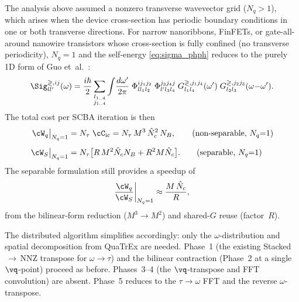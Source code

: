 The analysis above assumed a nonzero transverse wavevector
grid ($N_q > 1$), which arises when the device cross-section
has periodic boundary conditions in one or both transverse
directions.  For narrow nanoribbons, FinFETs, or gate-all-around
nanowire transistors whose cross-section is fully confined
(no transverse periodicity), $N_q = 1$ and the self-energy
\cref{eq:sigma_phph} reduces to the purely 1D form of
Guo et~al.~\cite[Eq. 8]{guo_quantum_2020}:
\begin{equation}
  \Sig^{\gtrless,ij}_{ll'}(\omega)
  = \frac{i\hbar}{2}
    \sum_{\substack{l_{1..4}\\j_{1..4}}}
    \int\!\frac{d\omega'}{2\pi}\;
    \Phi^{ij_1j_2}_{ll_1l_2}\;
    \Phi^{j_3j_4 j}_{l'l_3l_4}\;
    G^{\gtrless,j_1j_4}_{l_1 l_4}(\omega')\;
    G^{\gtrless,j_2j_3}_{l_2 l_3}(\omega{-}\omega').
  \label{eq:sigma_1d}
\end{equation}
The total cost per SCBA iteration is then
\begin{align}
  \cW_q\big|_{N_q=1}
  &= N_\tau\;\cC_\mathrm{ic}
  = N_\tau\,M^3\,\hat{N}_c^2\,N_B,
  \tag{non-separable, $N_q{=}1$}
  \label{eq:cost_nq1_nonsep}
  \\[4pt]
  \cW_S\big|_{N_q=1}
  &= N_\tau\bigl[
    R\,M^2\hat{N}_c N_B + R^2 M\hat{N}_c
  \bigr].
  \tag{separable, $N_q{=}1$}
  \label{eq:cost_nq1_sep}
\end{align}
The separable formulation still provides a speedup of
\begin{equation}
  \frac{\cW_q}{\cW_S}\bigg|_{N_q=1}
  \approx
  \frac{M\,\hat{N}_c}{R},
  \label{eq:speedup_nq1}
\end{equation}
from the bilinear-form reduction ($M^3 \to M^2$) and shared-$G$
reuse (factor~$R$).

The distributed algorithm simplifies accordingly: only
the $\omega$-distribution and spatial decomposition from
QuaTrEx are needed.  Phase~1 (the existing
Stacked$\,\to\,$NNZ transpose for $\omega\to\tau$) and the
bilinear contraction (Phase~2 at a single $\vq$-point) proceed
as before.  Phases~3--4 (the $\vq$-transpose and FFT
convolution) are absent.  Phase~5 reduces to the
$\tau\to\omega$ FFT and the reverse $\omega$-transpose.

